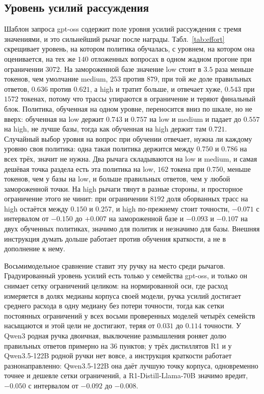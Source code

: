 \documentclass[11pt]{article}
\begin{document}
\subsection{Уровень усилий рассуждения}
\label{sec:effort}

Шаблон запроса gpt-oss содержит поле уровня усилий рассуждения с тремя значениями, и это сильнейший рычаг после награды. Табл.~\ref{tab:effort} скрещивает уровень, на котором политика обучалась, с уровнем, на котором она оценивается, на тех же $140$ отложенных вопросах в одном жадном прогоне при ограничении $3072$. На замороженной базе значение low стоит в $3.5$ раза меньше токенов, чем умолчание medium, $253$ против $879$, при той же доле правильных ответов, $0.636$ против $0.621$, а high и тратит больше, и отвечает хуже, $0.543$ при $1572$ токенах, потому что трассы упираются в ограничение и теряют финальный блок. Политика, обученная на одном уровне, переносится вниз по шкале, но не вверх: обученная на low держит $0.743$ и $0.757$ на low и medium и падает до $0.557$ на high, не лучше базы, тогда как обученная на high держит там $0.721$. Случайный выбор уровня на вопрос при обучении отвечает, нужна ли каждому уровню своя политика: одна такая политика держится между $0.750$ и $0.786$ на всех трёх, значит не нужна. Два рычага складываются на low и medium, и самая дешёвая точка раздела есть эта политика на low, $162$ токена при $0.750$, меньше токенов, чем у базы на low, и больше правильных ответов, чем у любой замороженной точки. На high рычаги тянут в разные стороны, и просторное ограничение этого не чинит: при ограничении $8192$ доля оборванных трасс на high остаётся между $0.150$ и $0.257$, и high по-прежнему стоит точности, $-0.071$ с интервалом от $-0.150$ до $+0.007$ на замороженной базе и $-0.093$ и $-0.107$ на двух обученных политиках, значимо для политик и незначимо для базы. Внешняя инструкция думать дольше работает против обучения краткости, а не в дополнение к нему.

Восьмимодельное сравнение ставит эту ручку на место среди рычагов. Градуированный уровень усилий есть только у семейства gpt-oss, и только он снимает сетку ограничений целиком: на нормированной оси, где расход измеряется в долях медианы корпуса своей модели, ручка усилий достигает среднего расхода в одну медиану без потери точности, тогда как сетки постоянных ограничений у всех восьми проверенных моделей четырёх семейств насыщаются и этой цели не достигают, теряя от $0.031$ до $0.114$ точности. У Qwen3 родная ручка двоичная, выключение размышления роняет долю правильных ответов примерно на $36$ пунктов; у трёх дистиллятов R1 и у Qwen3.5-122B родной ручки нет вовсе, а инструкция краткости работает разнонаправленно: Qwen3.5-122B она даёт лучшую точку корпуса, одновременно точнее и дешевле сетки ограничений, а R1-Distill-Llama-70B значимо вредит, $-0.050$ с интервалом от $-0.092$ до $-0.008$.
\end{document}
